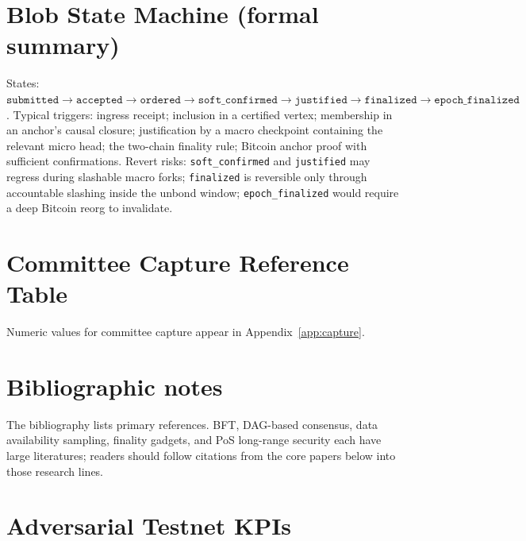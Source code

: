 \documentclass[11pt,a4paper,twoside]{report}
\theoremstyle{definition}
\begin{document}
\appendix

\chapter{Blob State Machine (formal summary)}
States: $\texttt{submitted} \to \texttt{accepted} \to \texttt{ordered} \to \texttt{soft\_confirmed} \to \texttt{justified} \to \texttt{finalized} \to \texttt{epoch\_finalized}$. Typical triggers: ingress receipt; inclusion in a certified vertex; membership in an anchor's causal closure; justification by a macro checkpoint containing the relevant micro head; the two-chain finality rule; Bitcoin anchor proof with sufficient confirmations. Revert risks: \texttt{soft\_confirmed} and \texttt{justified} may regress during slashable macro forks; \texttt{finalized} is reversible only through accountable slashing inside the unbond window; \texttt{epoch\_finalized} would require a deep Bitcoin reorg to invalidate.

\chapter{Committee Capture Reference Table}
Numeric values for committee capture appear in Appendix~\ref{app:capture}.

\chapter{Bibliographic notes}
The bibliography lists primary references. BFT, DAG-based consensus, data availability sampling, finality gadgets, and PoS long-range security each have large literatures; readers should follow citations from the core papers below into those research lines.

\chapter{Adversarial Testnet KPIs}
\label{app:kpi}
\end{document}
